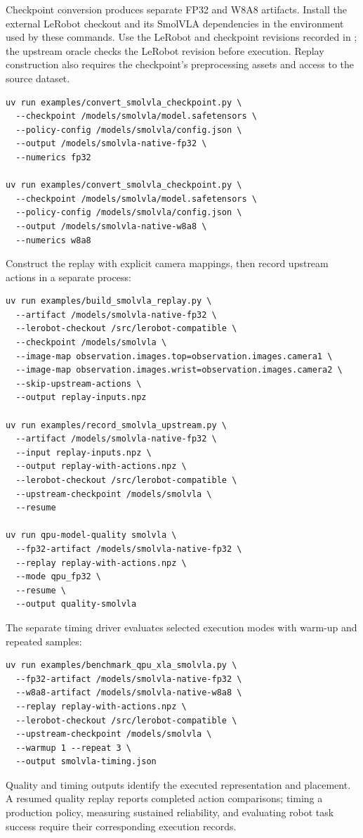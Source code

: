 \documentclass[sigplan,screen,review]{acmart}
\begin{document}
Checkpoint conversion produces separate FP32 and W8A8 artifacts.
Install the external LeRobot checkout and its SmolVLA dependencies
in the environment used by these commands. Use the LeRobot and
checkpoint revisions recorded in
; the upstream oracle
checks the LeRobot revision before execution. Replay construction
also requires the checkpoint's preprocessing assets and access to
the source dataset.

{\footnotesize
\begin{verbatim}
uv run examples/convert_smolvla_checkpoint.py \
  --checkpoint /models/smolvla/model.safetensors \
  --policy-config /models/smolvla/config.json \
  --output /models/smolvla-native-fp32 \
  --numerics fp32

uv run examples/convert_smolvla_checkpoint.py \
  --checkpoint /models/smolvla/model.safetensors \
  --policy-config /models/smolvla/config.json \
  --output /models/smolvla-native-w8a8 \
  --numerics w8a8
\end{verbatim}
}

Construct the replay with explicit camera mappings, then record upstream actions in a separate process:

{\footnotesize
\begin{verbatim}
uv run examples/build_smolvla_replay.py \
  --artifact /models/smolvla-native-fp32 \
  --lerobot-checkout /src/lerobot-compatible \
  --checkpoint /models/smolvla \
  --image-map observation.images.top=observation.images.camera1 \
  --image-map observation.images.wrist=observation.images.camera2 \
  --skip-upstream-actions \
  --output replay-inputs.npz

uv run examples/record_smolvla_upstream.py \
  --artifact /models/smolvla-native-fp32 \
  --input replay-inputs.npz \
  --output replay-with-actions.npz \
  --lerobot-checkout /src/lerobot-compatible \
  --upstream-checkpoint /models/smolvla \
  --resume

uv run qpu-model-quality smolvla \
  --fp32-artifact /models/smolvla-native-fp32 \
  --replay replay-with-actions.npz \
  --mode qpu_fp32 \
  --resume \
  --output quality-smolvla
\end{verbatim}
}

The separate timing driver evaluates selected execution modes with warm-up and repeated samples:

{\footnotesize
\begin{verbatim}
uv run examples/benchmark_qpu_xla_smolvla.py \
  --fp32-artifact /models/smolvla-native-fp32 \
  --w8a8-artifact /models/smolvla-native-w8a8 \
  --replay replay-with-actions.npz \
  --lerobot-checkout /src/lerobot-compatible \
  --upstream-checkpoint /models/smolvla \
  --warmup 1 --repeat 3 \
  --output smolvla-timing.json
\end{verbatim}
}

Quality and timing outputs identify the executed representation and placement. A resumed quality replay reports completed action comparisons; timing a production policy, measuring sustained reliability, and evaluating robot task success require their corresponding execution records.
\end{document}
